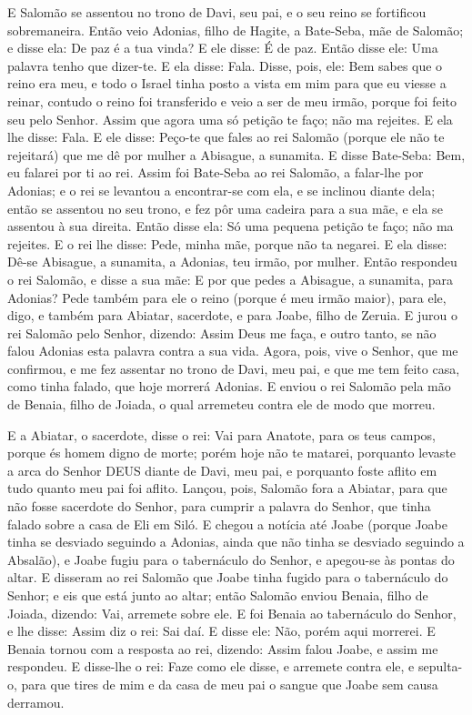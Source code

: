 E Salomão se assentou no trono de Davi, seu pai, e o seu reino se
fortificou sobremaneira. Então veio Adonias, filho de Hagite,
a Bate-Seba, mãe de Salomão; e disse ela: De paz é a tua vinda? E
ele disse: É de paz. Então disse ele: Uma palavra tenho que
dizer-te. E ela disse: Fala. Disse, pois, ele: Bem sabes que
o reino era meu, e todo o Israel tinha posto a vista em mim para que
eu viesse a reinar, contudo o reino foi transferido e veio a ser de
meu irmão, porque foi feito seu pelo Senhor. Assim que agora
uma só petição te faço; não ma rejeites. E ela lhe disse: Fala.
E ele disse: Peço-te que fales ao rei Salomão (porque ele não
te rejeitará) que me dê por mulher a Abisague, a sunamita. E
disse Bate-Seba: Bem, eu falarei por ti ao rei. Assim foi
Bate-Seba ao rei Salomão, a falar-lhe por Adonias; e o rei se
levantou a encontrar-se com ela, e se inclinou diante dela; então se
assentou no seu trono, e fez pôr uma cadeira para a sua mãe, e ela
se assentou à sua direita. Então disse ela: Só uma pequena
petição te faço; não ma rejeites. E o rei lhe disse: Pede, minha
mãe, porque não ta negarei. E ela disse: Dê-se Abisague, a
sunamita, a Adonias, teu irmão, por mulher. Então respondeu o
rei Salomão, e disse a sua mãe: E por que pedes a Abisague, a
sunamita, para Adonias? Pede também para ele o reino (porque é meu
irmão maior), para ele, digo, e também para Abiatar, sacerdote, e
para Joabe, filho de Zeruia. E jurou o rei Salomão pelo
Senhor, dizendo: Assim Deus me faça, e outro tanto, se não falou
Adonias esta palavra contra a sua vida. Agora, pois, vive o
Senhor, que me confirmou, e me fez assentar no trono de Davi, meu
pai, e que me tem feito casa, como tinha falado, que hoje morrerá
Adonias. E enviou o rei Salomão pela mão de Benaia, filho de
Joiada, o qual arremeteu contra ele de modo que morreu.

E a Abiatar, o sacerdote, disse o rei: Vai para Anatote, para os
teus campos, porque és homem digno de morte; porém hoje não te
matarei, porquanto levaste a arca do Senhor DEUS diante de Davi, meu
pai, e porquanto foste aflito em tudo quanto meu pai foi aflito.
Lançou, pois, Salomão fora a Abiatar, para que não fosse
sacerdote do Senhor, para cumprir a palavra do Senhor, que tinha
falado sobre a casa de Eli em Siló. E chegou a notícia até
Joabe (porque Joabe tinha se desviado seguindo a Adonias, ainda que
não tinha se desviado seguindo a Absalão), e Joabe fugiu para o
tabernáculo do Senhor, e apegou-se às pontas do altar. E
disseram ao rei Salomão que Joabe tinha fugido para o tabernáculo do
Senhor; e eis que está junto ao altar; então Salomão enviou Benaia,
filho de Joiada, dizendo: Vai, arremete sobre ele. E foi
Benaia ao tabernáculo do Senhor, e lhe disse: Assim diz o rei: Sai
daí. E disse ele: Não, porém aqui morrerei. E Benaia tornou com a
resposta ao rei, dizendo: Assim falou Joabe, e assim me respondeu.
E disse-lhe o rei: Faze como ele disse, e arremete contra
ele, e sepulta-o, para que tires de mim e da casa de meu pai o
sangue que Joabe sem causa derramou.

